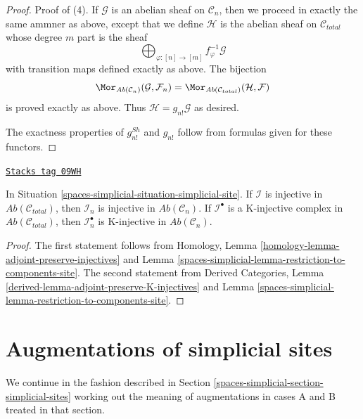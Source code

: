 \begin{proof}
\medskip\noindent
Proof of (4). If $\mathcal{G}$ is an abelian sheaf on $\mathcal{C}_n$,
then we proceed in exactly the same ammner as above, except that
we define $\mathcal{H}$ is the abelian sheaf on $\mathcal{C}_{total}$
whose degree $m$ part is the sheaf
$$
\bigoplus\nolimits_{\varphi : [n] \to [m]} f_\varphi^{-1}\mathcal{G}
$$
with transition maps defined exactly as above. The bijection
$$
\Mor_{\textit{Ab}(\mathcal{C}_n)}(\mathcal{G}, \mathcal{F}_n) =
\Mor_{\textit{Ab}(\mathcal{C}_{total})}(\mathcal{H}, \mathcal{F})
$$
is proved exactly as above.
Thus $\mathcal{H} = g_{n!}\mathcal{G}$ as desired.

\medskip\noindent
The exactness properties of $g^{Sh}_{n!}$ and $g_{n!}$ follow
from formulas given for these functors.
\end{proof}

\begin{lemma}
\label{spaces-simplicial-lemma-restriction-injective-to-component-site}
\href{https://stacks.math.columbia.edu/tag/09WH}{\texttt{Stacks tag 09WH}}


In Situation \ref{spaces-simplicial-situation-simplicial-site}.
If $\mathcal{I}$ is injective in $\textit{Ab}(\mathcal{C}_{total})$,
then $\mathcal{I}_n$ is injective in $\textit{Ab}(\mathcal{C}_n)$.
If $\mathcal{I}^\bullet$ is a K-injective complex in
$\textit{Ab}(\mathcal{C}_{total})$,
then $\mathcal{I}_n^\bullet$ is K-injective in $\textit{Ab}(\mathcal{C}_n)$.
\end{lemma}

\begin{proof}
The first statement follows from
Homology, Lemma \ref{homology-lemma-adjoint-preserve-injectives}
and
Lemma \ref{spaces-simplicial-lemma-restriction-to-components-site}.
The second statement from
Derived Categories, Lemma \ref{derived-lemma-adjoint-preserve-K-injectives}
and
Lemma \ref{spaces-simplicial-lemma-restriction-to-components-site}.
\end{proof}

\section{Augmentations of simplicial sites}
\label{spaces-simplicial-section-augmentation-simplicial-sites}
We continue in the fashion described in
Section \ref{spaces-simplicial-section-simplicial-sites}
working out the meaning of augmentations in cases A and B
treated in that section.

